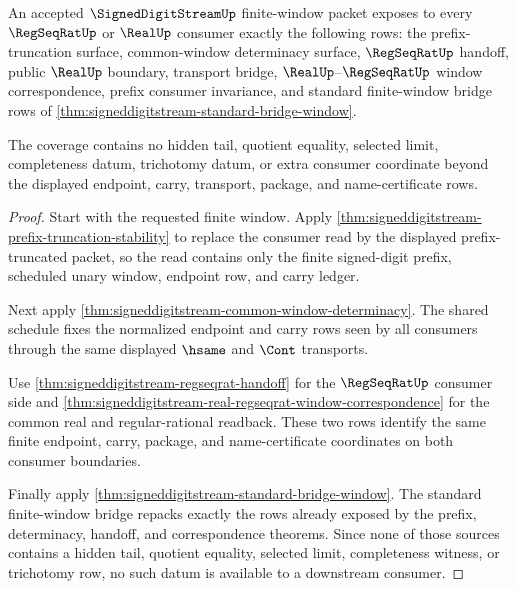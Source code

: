 \begin{theorem}
\label{thm:signeddigitstream-mature-consumer-coverage}
An accepted $\SignedDigitStreamUp$ finite-window packet exposes to every
$\RegSeqRatUp$ or $\RealUp$ consumer exactly the following rows: the
prefix-truncation surface, common-window determinacy surface,
$\RegSeqRatUp$ handoff, public $\RealUp$ boundary, transport bridge,
$\RealUp$--$\RegSeqRatUp$ window correspondence, prefix consumer invariance,
and standard finite-window bridge rows of
\autoref{thm:signeddigitstream-standard-bridge-window}.

The coverage contains no hidden tail, quotient equality, selected limit,
completeness datum, trichotomy datum, or extra consumer coordinate beyond the
displayed endpoint, carry, transport, package, and name-certificate rows.
\end{theorem}
\begin{proof}
Start with the requested finite window. Apply
\autoref{thm:signeddigitstream-prefix-truncation-stability} to replace the
consumer read by the displayed prefix-truncated packet, so the read contains
only the finite signed-digit prefix, scheduled unary window, endpoint row, and
carry ledger.

Next apply
\autoref{thm:signeddigitstream-common-window-determinacy}. The shared schedule
fixes the normalized endpoint and carry rows seen by all consumers through the
same displayed $\hsame$ and $\Cont$ transports.

Use \autoref{thm:signeddigitstream-regseqrat-handoff} for the
$\RegSeqRatUp$ consumer side and
\autoref{thm:signeddigitstream-real-regseqrat-window-correspondence} for the
common real and regular-rational readback. These two rows identify the same
finite endpoint, carry, package, and name-certificate coordinates on both
consumer boundaries.

Finally apply \autoref{thm:signeddigitstream-standard-bridge-window}. The
standard finite-window bridge repacks exactly the rows already exposed by the
prefix, determinacy, handoff, and correspondence theorems. Since none of those
sources contains a hidden tail, quotient equality, selected limit, completeness
witness, or trichotomy row, no such datum is available to a downstream
consumer.
\end{proof}

